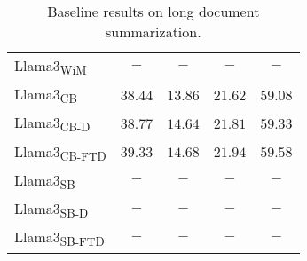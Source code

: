 \begin{table*}
\begin{tabular}{l c c c c}
Llama3\textsubscript{WiM}&$-$& $-$& $-$& $-$\\
Llama3\textsubscript{CB}&$38.44$& $13.86$& $21.62$& $59.08$\\
Llama3\textsubscript{CB-D}&$38.77$& $14.64$& $21.81$& $59.33$\\
Llama3\textsubscript{CB-FTD}&$39.33$& $14.68$& $21.94$& $59.58$\\
Llama3\textsubscript{SB}&$-$& $-$& $-$& $-$\\
Llama3\textsubscript{SB-D}&$-$& $-$& $-$& $-$\\
Llama3\textsubscript{SB-FTD}&$-$& $-$& $-$& $-$\\

    \bottomrule %

    \end{tabular}
    \caption{Baseline results on long document summarization.} %
    \label{tab:baseline_results}
\end{table*}
